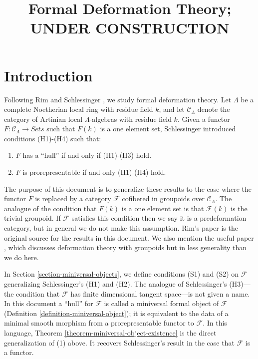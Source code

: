 


%


\title{Formal Deformation Theory; UNDER CONSTRUCTION}


\maketitle

\label{section-phantom}

\tableofcontents



\section{Introduction}
\label{section-introduction}

\noindent
Following Rim \cite[Exposee VI]{SGA7-I} and Schlessinger \cite{Sch}, we 
study formal deformation theory. Let $\Lambda$ be a complete Noetherian local 
ring with residue field $k$, and let $\mathcal{C}_\Lambda$ denote the category 
of Artinian local $\Lambda$-algebras with residue field $k$.  Given a functor 
$F: \mathcal{C}_\Lambda \to \textit{Sets}$ such that $F(k)$ is a 
one element set, Schlessinger \cite{Sch} introduced conditions 
(H1)-(H4) such that: 
\begin{enumerate}
\item $F$ has a ``hull'' if and only if (H1)-(H3) hold.
\item $F$ is prorepresentable if and only (H1)-(H4) hold.
\end{enumerate} 
The purpose of this document is to generalize these results to the case where 
the functor $F$ is replaced by a category $\mathcal{F}$ cofibered in groupoids 
over $\mathcal{C}_\Lambda$.  The analogue of the condition that $F(k)$ is a 
one element set is that $\mathcal{F}(k)$ is the trivial groupoid. If
$\mathcal{F}$ satisfies this condition then we say it is a predeformation
category, but in  general we do not make this assumption.  Rim's paper
\cite[Exposee VI]{SGA7-I} is the original 
source for the results in this document.  We also mention the useful paper 
\cite{Vistoli}, which discusses deformation theory with groupoids but in less 
generality than we do here.
  
\medskip \noindent
In Section \ref{section-miniversal-objects}, we define conditions (S1) and (S2) 
on $\mathcal{F}$ generalizing Schlessinger's (H1) and (H2).  The analogue of 
Schlessinger's (H3)---the condition that $\mathcal{F}$ has finite dimensional 
tangent space---is not given a name.  In this document a ``hull'' for $\mathcal 
F$ is called a miniversal formal object of $\mathcal{F}$ (Definition 
\ref{definition-miniversal-object}); it is equivalent to the data of a minimal 
smooth morphism from a prorepresentable functor to $\mathcal{F}$.  In this 
language, Theorem \ref{theorem-miniversal-object-existence} is the direct 
generalization of (1) above. It recovers Schlessinger's result in the case that 
$\mathcal{F}$ is a functor.

